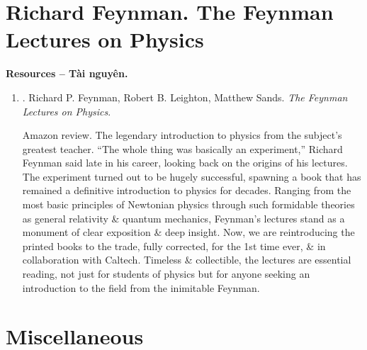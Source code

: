 \documentclass{article}
\begin{document}
\section{{\sc Richard Feynman}. The Feynman Lectures on Physics}
\textbf{\textsf{Resources -- Tài nguyên.}}
\begin{enumerate}
	\item \cite{Feyman_Leighton_Sands_lecture_physics}. {\sc Richard P. Feynman, Robert B. Leighton, Matthew Sands}. {\it The Feynman Lectures on Physics}. {}
	
	{\sf Amazon review.} The legendary introduction to physics from the subject's greatest teacher. ``The whole thing was basically an experiment,'' {\sc Richard Feynman} said late in his career, looking back on the origins of his lectures. The experiment turned out to be hugely successful, spawning a book that has remained a definitive introduction to physics for decades. Ranging from the most basic principles of Newtonian physics through such formidable theories as general relativity \& quantum mechanics, {\sc Feynman}'s lectures stand as a monument of clear exposition \& deep insight. Now, we are reintroducing the printed books to the trade, fully corrected, for the 1st time ever, \& in collaboration with Caltech. Timeless \& collectible, the lectures are essential reading, not just for students of physics but for anyone seeking an introduction to the field from the inimitable {\sc Feynman}.
\end{enumerate}


\section{Miscellaneous}


\printbibliography[heading=bibintoc]
	
\end{document}
